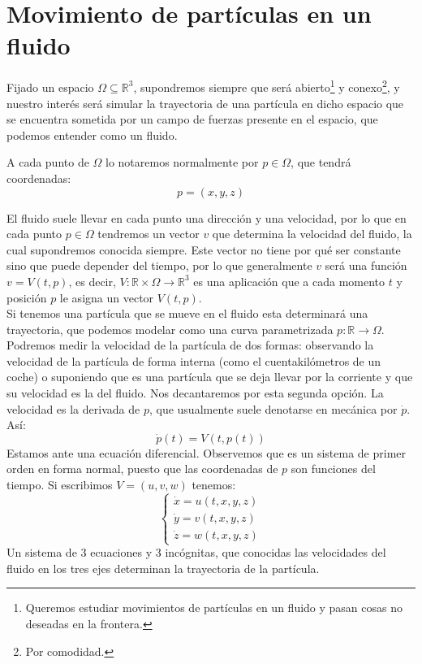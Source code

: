 \chapter{Movimiento de partículas en un fluido}
\noindent
Fijado un espacio $\Omega\subseteq \mathbb{R}^3$, supondremos siempre que será abierto\footnote{Queremos estudiar movimientos de partículas en un fluido y pasan cosas no deseadas en la frontera.} y conexo\footnote{Por comodidad.}, y nuestro interés será simular la trayectoria de una partícula en dicho espacio que se encuentra sometida por un campo de fuerzas presente en el espacio, que podemos entender como un fluido.

\begin{notacion}
    A cada punto de $\Omega$ lo notaremos normalmente por $p\in \Omega$, que tendrá coordenadas:
    \begin{equation*}
        p = (x,y,z)
    \end{equation*}
\end{notacion}

\noindent
El fluido suele llevar en cada punto una dirección y una velocidad, por lo que en cada punto $p\in \Omega$ tendremos un vector $v$ que determina la velocidad del fluido, la cual supondremos conocida siempre. Este vector no tiene por qué ser constante sino que puede depender del tiempo, por lo que generalmente $v$ será una función $v = V(t,p)$, es decir, $V:\mathbb{R}\times \Omega\to \mathbb{R}^3$ es una aplicación que a cada momento $t$ y posición $p$ le asigna un vector $V(t,p)$.\\

\noindent
Si tenemos una partícula que se mueve en el fluido esta determinará una trayectoria, que podemos modelar como una curva parametrizada $p:\mathbb{R}\to \Omega$.\\

\noindent
Podremos medir la velocidad de la partícula de dos formas: observando la velocidad de la partícula de forma interna (como el cuentakilómetros de un coche) o suponiendo que es una partícula que se deja llevar por la corriente y que su velocidad es la del fluido. Nos decantaremos por esta segunda opción. La velocidad es la derivada de $p$, que usualmente suele denotarse en mecánica por $\dot{p}$.\\

\noindent
Así:
\begin{equation*}
    \dot{p}(t) = V(t,p(t))
\end{equation*}
Estamos ante una ecuación diferencial. Observemos que es un sistema de primer orden en forma normal, puesto que las coordenadas de $p$ son funciones del tiempo. Si escribimos $V = (u,v,w)$ tenemos:
\begin{equation*}
    \left\{\begin{array}{l}
            \dot{x} = u(t,x,y,z) \\
            \dot{y} = v(t,x,y,z) \\
            \dot{z} = w(t,x,y,z)
    \end{array}\right.
\end{equation*}
Un sistema de 3 ecuaciones y 3 incógnitas, que conocidas las velocidades del fluido en los tres ejes determinan la trayectoria de la partícula. 

